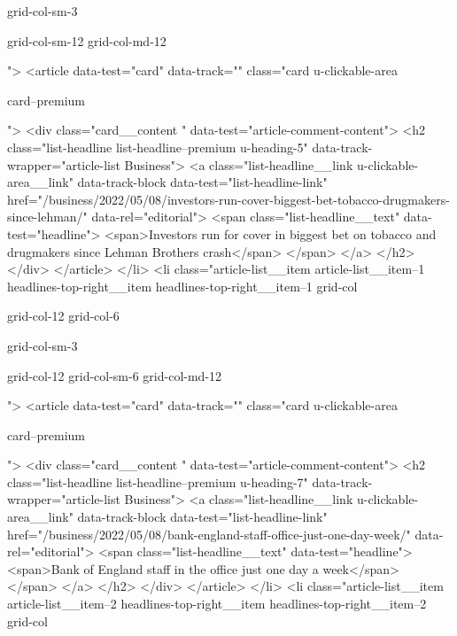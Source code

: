 {{{			
			
			grid-col-sm-3
			
			
			
			
			grid-col-sm-12 grid-col-md-12
			
			
			
			">
<article data-test="card" data-track="" class="card
			u-clickable-area
			
			
			card--premium
			
			
			
			
			
			 ">
<div class="card__content " data-test="article-comment-content">
<h2 class="list-headline list-headline--premium u-heading-5" data-track-wrapper="article-list Business">
<a class="list-headline__link u-clickable-area__link" data-track-block data-test="list-headline-link" href="/business/2022/05/08/investors-run-cover-biggest-bet-tobacco-drugmakers-since-lehman/" data-rel="editorial">
<span class="list-headline__text" data-test="headline">
<span>Investors run for cover in biggest bet on tobacco and drugmakers since Lehman Brothers crash</span>
</span>
</a>
</h2>
</div>
</article>
</li>
<li class="article-list__item article-list__item--1 headlines-top-right__item headlines-top-right__item--1
			grid-col
			
			
			
			grid-col-12
			grid-col-6
			
			
			
			
			
			grid-col-sm-3
			
			
			
			
			
			grid-col-12 grid-col-sm-6 grid-col-md-12
			
			
			">
<article data-test="card" data-track="" class="card
			u-clickable-area
			
			
			card--premium
			
			
			
			
			
			 ">
<div class="card__content " data-test="article-comment-content">
<h2 class="list-headline list-headline--premium u-heading-7" data-track-wrapper="article-list Business">
<a class="list-headline__link u-clickable-area__link" data-track-block data-test="list-headline-link" href="/business/2022/05/08/bank-england-staff-office-just-one-day-week/" data-rel="editorial">
<span class="list-headline__text" data-test="headline">
<span>Bank of England staff in the office just one day a week</span>
</span>
</a>
</h2>
</div>
</article>
</li>
<li class="article-list__item article-list__item--2 headlines-top-right__item headlines-top-right__item--2
			grid-col
			
}}}
